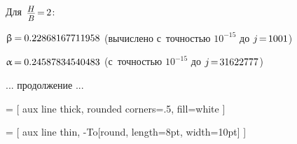 \documentclass[14pt]{extarticle}
\begin{document}
\begin{minipage}{\linewidth}
Для ${\hspace{.2ex}\scalebox{.84}{$\displaystyle\frac{\raisebox{-0.2em}{$H$}}{B}$} \hspace{-0.3ex}=\hspace{-0.2ex} 2}$:
\vspace{.2cm}

${\upbeta \hspace{-0.2ex}=\hspace{-0.1ex}
0.22868167711958}$
\hspace{.2ex}
(вычислено с~точностью ${10^{-15}}$ до ${j \hspace{-0.33ex}=\hspace{-0.3ex} 1001}$)

${\upalpha \hspace{-0.2ex}=\hspace{-0.1ex}
0.24587834540483}$
\hspace{.2ex}
(с~точностью ${10^{-15}}$ до ${j \hspace{-0.33ex}=\hspace{-0.3ex} 31622777}$)
\end{minipage}

\vspace{1cm}

... продолжение ...

\vspace{1cm}

 = [ aux line thick, rounded corners=.5\pgflinewidth, fill=white ]

\newcommand\drawcube[1]{
	\draw [ cube side, tdplot_main_coords ]
		( 0, 0, 0 ) -- ( #1, 0, 0 ) -- ( #1, #1, 0 ) -- ( 0, #1, 0 )
		-- cycle ;
	\draw [ cube side, tdplot_main_coords ]
		( 0, 0, 0 ) -- ( 0, #1, 0 ) -- ( 0, #1, #1 ) -- ( 0, 0, #1 )
		-- cycle ;
	\draw [ cube side, tdplot_main_coords ]
		( 0, 0, 0 ) -- ( #1, 0, 0 ) -- ( #1, 0, #1 ) -- ( 0, 0, #1 )
		-- cycle ;
	\draw [ cube side, tdplot_main_coords ]
		( 0, #1, 0 ) -- ( #1, #1, 0 ) -- ( #1, #1, #1 ) -- ( 0, #1, #1 )
		-- cycle ;
	\draw [ cube side, tdplot_main_coords ]
		( 0, 0, #1 ) -- ( #1, 0, #1 ) -- ( #1, #1, #1 ) -- ( 0, #1, #1 )
		-- cycle ;
	\draw [ cube side, tdplot_main_coords ]
		( #1, 0, 0 ) -- ( #1, #1, 0 ) -- ( #1, #1, #1 ) -- ( #1, 0, #1 )
		-- cycle ;
}

 = [ aux line thin, -{To[round, length=8pt, width=10pt]} ]

\newcommand\drawaxes{
\draw [ axis with arrow, tdplot_main_coords ]
	( 0, 0, 0 ) -- ++( \showcoordinatelength, 0, 0 )
	node [ pos=1.05, below, shape=circle, inner sep=0pt, outer sep=4.4pt ]
		{\scalebox{\textscale}{$ x $}} ;
\draw [ axis with arrow, tdplot_main_coords ]
	( 0, 0, 0 ) -- ++( 0, \showcoordinatelength, 0 )
	node [ pos=1, below, shape=circle, inner sep=0pt, outer sep=6.3pt ]
		{\scalebox{\textscale}{$ y $}} ;
\draw [ axis with arrow, tdplot_main_coords ]
	( 0, 0, 0 ) -- ++( 0, 0, .9*\showcoordinatelength )
	node [ pos=1, above, shape=circle, inner sep=0pt, outer sep=3.3pt ]
		{\scalebox{\textscale}{$ z $}} ;
}
\end{document}
